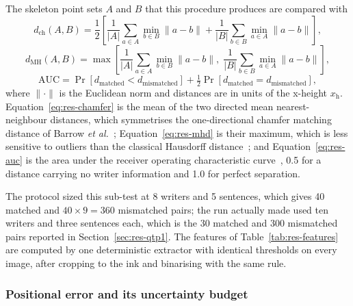 The skeleton point sets $A$ and $B$ that this procedure produces are compared with
\begin{equation}
\label{eq:res-chamfer}
d_{\mathrm{ch}}(A,B)=\frac{1}{2}\left[\frac{1}{\lvert A\rvert}\sum_{a\in A}\min_{b\in B}\lVert a-b\rVert+\frac{1}{\lvert B\rvert}\sum_{b\in B}\min_{a\in A}\lVert a-b\rVert\right],
\end{equation}
\begin{equation}
\label{eq:res-mhd}
d_{\mathrm{MH}}(A,B)=\max\left[\frac{1}{\lvert A\rvert}\sum_{a\in A}\min_{b\in B}\lVert a-b\rVert,\;\frac{1}{\lvert B\rvert}\sum_{b\in B}\min_{a\in A}\lVert a-b\rVert\right],
\end{equation}
\begin{equation}
\label{eq:res-auc}
\mathrm{AUC}=\Pr\left[d_{\mathrm{matched}}<d_{\mathrm{mismatched}}\right]+\tfrac{1}{2}\Pr\left[d_{\mathrm{matched}}=d_{\mathrm{mismatched}}\right],
\end{equation}
where $\lVert\cdot\rVert$ is the Euclidean norm and distances are in units of the x-height $x_{\mathrm{h}}$.
Equation~\ref{eq:res-chamfer} is the mean of the two directed mean nearest-neighbour distances, which symmetrises the one-directional chamfer matching distance of Barrow \emph{et al.}~\cite[pp.~659--660]{barrow1977}; Equation~\ref{eq:res-mhd} is their maximum, which is less sensitive to outliers than the classical Hausdorff distance~\cite{dubuisson1994}; and Equation~\ref{eq:res-auc} is the area under the receiver operating characteristic curve~\cite[p.~868]{fawcett2006}, 0.5 for a distance carrying no writer information and 1.0 for perfect separation.


The protocol sized this sub-test at 8 writers and 5 sentences, which gives 40 matched and $40\times9=360$ mismatched pairs; the run actually made used ten writers and three sentences each, which is the 30 matched and 300 mismatched pairs reported in Section~\ref{sec:res-qtp1}.
The features of Table~\ref{tab:res-features} are computed by one deterministic extractor with identical thresholds on every image, after cropping to the ink and binarising with the same rule.

\subsubsection{Positional error and its uncertainty budget}

